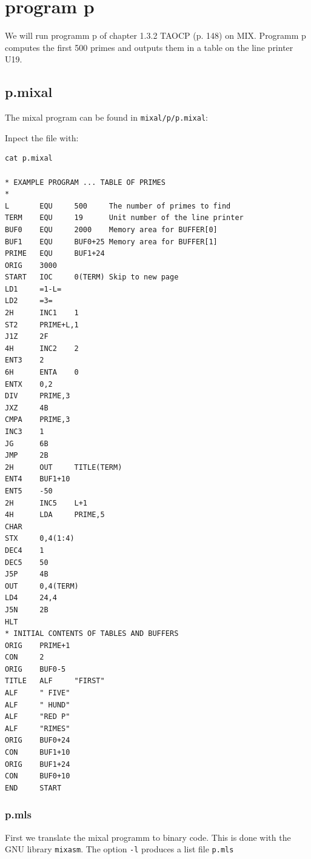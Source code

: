 \documentclass[a4paper,ngerman]{scrartcl}
\begin{document}
\section{program p}
We will run programm p of chapter 1.3.2 TAOCP (p. 148) on MIX. Programm p computes the first 500 primes and outputs them in a table on the line printer U19.

\subsection{p.mixal}
The mixal program can be found in \lstinline|mixal/p/p.mixal|:

Inpect the file with:
\begin{lstlisting}
cat p.mixal

* EXAMPLE PROGRAM ... TABLE OF PRIMES
*
L		EQU		500		The number of primes to find
TERM	EQU		19		Unit number of the line printer
BUF0	EQU		2000	Memory area for BUFFER[0]
BUF1	EQU		BUF0+25	Memory area for BUFFER[1]
PRIME	EQU		BUF1+24
ORIG	3000
START	IOC		0(TERM)	Skip to new page
LD1		=1-L=
LD2		=3=
2H		INC1	1
ST2		PRIME+L,1
J1Z		2F
4H		INC2	2
ENT3	2
6H		ENTA	0
ENTX	0,2
DIV		PRIME,3
JXZ		4B
CMPA	PRIME,3
INC3	1
JG		6B
JMP		2B
2H		OUT		TITLE(TERM)
ENT4	BUF1+10
ENT5	-50
2H		INC5	L+1
4H		LDA		PRIME,5
CHAR
STX		0,4(1:4)
DEC4	1
DEC5	50
J5P		4B
OUT		0,4(TERM)
LD4		24,4
J5N		2B
HLT
* INITIAL CONTENTS OF TABLES AND BUFFERS
ORIG	PRIME+1
CON		2
ORIG	BUF0-5
TITLE	ALF		"FIRST"
ALF		" FIVE"
ALF		" HUND"
ALF		"RED P"
ALF		"RIMES"
ORIG	BUF0+24
CON		BUF1+10
ORIG	BUF1+24
CON		BUF0+10
END		START
\end{lstlisting}

\subsubsection{p.mls}
First we translate the mixal programm to binary code. This is done with the GNU library \lstinline|mixasm|. The option \lstinline|-l| produces a list file \lstinline|p.mls|
\end{document}
